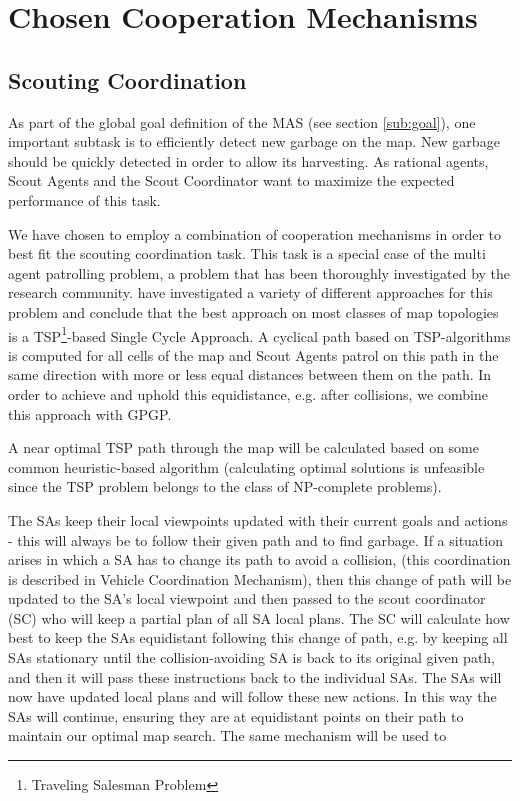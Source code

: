 \section{Chosen Cooperation Mechanisms}
\label{sec:chosCoop}


\subsection{Scouting Coordination}

As part of the global goal definition of the MAS (see section \ref{sub:goal}), one important subtask is to efficiently detect new garbage on the map. New garbage should be quickly detected in order to allow its harvesting. As rational agents, Scout Agents and the Scout Coordinator want to maximize the expected performance of this task.

We have chosen to employ a combination of cooperation mechanisms in order to best fit the scouting coordination task. This task is a special case of the multi agent patrolling problem, a problem that has been thoroughly investigated by the research community. \cite{Almeida2004} have investigated a variety of different approaches for this problem and conclude that the best approach on most classes of map topologies is a TSP\footnote{Traveling Salesman Problem}-based Single Cycle Approach. A cyclical path based on TSP-algorithms is computed for all cells of the map and Scout Agents patrol on this path in the same direction with more or less equal distances between them on the path. In order to achieve and uphold this equidistance, e.g. after collisions, we combine this approach with GPGP.

A near optimal TSP path through the map will be calculated based on some common heuristic-based algorithm (calculating optimal solutions is unfeasible since the TSP problem belongs to the class of NP-complete problems).  


The SAs keep their local viewpoints updated with their current goals and actions - this will always be to follow their given path and to find garbage. If a situation arises in which a SA has to change its path to avoid a collision, (this coordination is described in Vehicle Coordination Mechanism), then this change of path will be updated to the SA’s local viewpoint and then passed to the scout coordinator (SC) who will keep a partial plan of all SA local plans. The SC will calculate how best to keep the SAs equidistant following this change of path, e.g. by keeping all SAs stationary until the collision-avoiding SA is back to its original given path, and then it will pass these instructions back to the individual SAs. The SAs will now have updated local plans and will follow these new actions. In this way the SAs will continue, ensuring they are at equidistant points on their path to maintain our optimal map search. The same mechanism will be used to 
  


